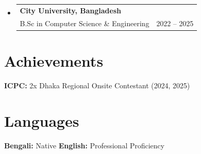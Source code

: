 \documentclass[letterpaper,10.5pt]{article}
\makeatletter
\newcommand{\resumeSubSubheading}[4]{
  \vspace{-2pt}\item
    \begin{tabular*}{0.97\textwidth}[t]{l@{\extracolsep{\fill}}r}
      \textbf{#1} & #2 \\[7pt]
      \small#3 & \small #4 \\
    \end{tabular*}\vspace{-2pt}
}
\newcommand{\resumeSubHeadingListStart}{\begin{itemize}[leftmargin=0.15in, label={}]}
\newcommand{\resumeSubHeadingListEnd}{\end{itemize}}
\makeatother
\begin{document}
\vspace{4pt}

\resumeSubHeadingListStart

\resumeSubSubheading
{City University, Bangladesh}{}
{B.Sc in Computer Science \& Engineering}{2022 -- 2025}

\resumeSubHeadingListEnd


\section{Achievements}

\vspace{4pt}

\begin{itemize}[leftmargin=0.15in, label={}]

\small{\item{

\textbf{ICPC:}{ 2x Dhaka Regional Onsite Contestant (2024, 2025)} \\[2pt]

}}

\end{itemize}


\section{Languages}

\vspace{4pt}

\begin{itemize}[leftmargin=0.15in, label={}]

\small{\item{

\textbf{Bengali:}{ Native} \quad\quad
\textbf{English:}{ Professional Proficiency}

}}

\end{itemize}

\end{document}
